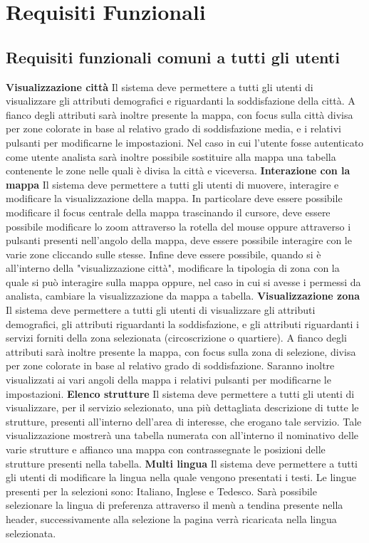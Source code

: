 \chapter{Requisiti Funzionali} 
    \section{Requisiti funzionali comuni a tutti gli utenti}
        \begin{rfList}
            \rfItem \textbf{Visualizzazione città} Il sistema deve permettere a tutti gli utenti di visualizzare gli attributi demografici e riguardanti la soddisfazione della città. A fianco degli attributi sarà inoltre presente la mappa, con focus sulla città divisa per zone colorate in base al relativo grado di soddisfazione media, e i relativi pulsanti per modificarne le impostazioni. Nel caso in cui l'utente fosse autenticato come utente analista sarà inoltre possibile sostituire alla mappa una tabella contenente le zone nelle quali è divisa la città e viceversa.
            \rfItem \textbf{Interazione con la mappa} Il sistema deve permettere a tutti gli utenti di muovere, interagire e modificare la visualizzazione della mappa. In particolare deve essere possibile modificare il focus centrale della mappa trascinando il cursore, deve essere possibile modificare lo zoom attraverso la rotella del mouse oppure attraverso i pulsanti presenti nell'angolo della mappa, deve essere possibile interagire con le varie zone cliccando sulle stesse. Infine deve essere possibile, quando si è all'interno della "visualizzazione città", modificare la tipologia di zona con la quale si può interagire sulla mappa oppure, nel caso in cui si avesse i permessi da analista, cambiare la visualizzazione da mappa a tabella.
            \rfItem \textbf{Visualizzazione zona} Il sistema deve permettere a tutti gli utenti di visualizzare gli attributi demografici, gli attributi riguardanti la soddisfazione, e gli attributi riguardanti i servizi forniti della zona selezionata (circoscrizione o quartiere). A fianco degli attributi sarà inoltre presente la mappa, con focus sulla zona di selezione, divisa per zone colorate in base al relativo grado di soddisfazione. Saranno inoltre visualizzati ai vari angoli della mappa i relativi pulsanti per modificarne le impostazioni.
            \rfItem \textbf{Elenco strutture} Il sistema deve permettere a tutti gli utenti di visualizzare, per il servizio selezionato, una più dettagliata descrizione di tutte le strutture, presenti all'interno dell'area di interesse, che erogano tale servizio. Tale visualizzazione mostrerà una tabella numerata con all'interno il nominativo delle varie strutture e affianco una mappa con contrassegnate le posizioni delle strutture presenti nella tabella.
            \rfItem \textbf{Multi lingua} Il sistema deve permettere a tutti gli utenti di modificare la lingua nella quale vengono presentati i testi. Le lingue presenti per la selezioni sono: Italiano, Inglese e Tedesco. Sarà possibile selezionare la lingua di preferenza attraverso il menù a tendina presente nella header, successivamente alla selezione la pagina verrà ricaricata nella lingua selezionata.
        \end{rfList}
